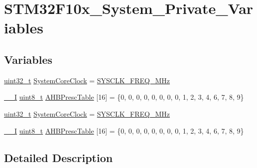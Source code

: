 \hypertarget{group___s_t_m32_f10x___system___private___variables}{}\section{S\+T\+M32\+F10x\+\_\+\+System\+\_\+\+Private\+\_\+\+Variables}
\label{group___s_t_m32_f10x___system___private___variables}
\subsection*{Variables}
\begin{DoxyCompactItemize}
\item 
\hyperlink{_p_e___types_8h_a33594304e786b158f3fb30289278f5af}{uint32\+\_\+t} \hyperlink{group___s_t_m32_f10x___system___private___variables_gaa3cd3e43291e81e795d642b79b6088e6}{System\+Core\+Clock} = \hyperlink{group___s_t_m32_f10x___system___private___defines_ga69649cc38f34627cfb48b51062ebd390}{S\+Y\+S\+C\+L\+K\+\_\+\+F\+R\+E\+Q\+\_\+M\+Hz}
\item 
\hyperlink{group___c_m_s_i_s___c_m3__core__definitions_gaf63697ed9952cc71e1225efe205f6cd3}{\+\_\+\+\_\+I} \hyperlink{_p_e___types_8h_aba7bc1797add20fe3efdf37ced1182c5}{uint8\+\_\+t} \hyperlink{group___s_t_m32_f10x___system___private___variables_gacdc3ef54c0704c90e69a8a84fb2d970d}{A\+H\+B\+Presc\+Table} \mbox{[}16\mbox{]} = \{0, 0, 0, 0, 0, 0, 0, 0, 1, 2, 3, 4, 6, 7, 8, 9\}
\item 
\hyperlink{_p_e___types_8h_a33594304e786b158f3fb30289278f5af}{uint32\+\_\+t} \hyperlink{group___s_t_m32_f10x___system___private___variables_gaa3cd3e43291e81e795d642b79b6088e6}{System\+Core\+Clock} = \hyperlink{group___s_t_m32_f10x___system___private___defines_ga69649cc38f34627cfb48b51062ebd390}{S\+Y\+S\+C\+L\+K\+\_\+\+F\+R\+E\+Q\+\_\+M\+Hz}
\item 
\hyperlink{group___c_m_s_i_s___c_m3__core__definitions_gaf63697ed9952cc71e1225efe205f6cd3}{\+\_\+\+\_\+I} \hyperlink{_p_e___types_8h_aba7bc1797add20fe3efdf37ced1182c5}{uint8\+\_\+t} \hyperlink{group___s_t_m32_f10x___system___private___variables_gacdc3ef54c0704c90e69a8a84fb2d970d}{A\+H\+B\+Presc\+Table} \mbox{[}16\mbox{]} = \{0, 0, 0, 0, 0, 0, 0, 0, 1, 2, 3, 4, 6, 7, 8, 9\}
\end{DoxyCompactItemize}


\subsection{Detailed Description}


